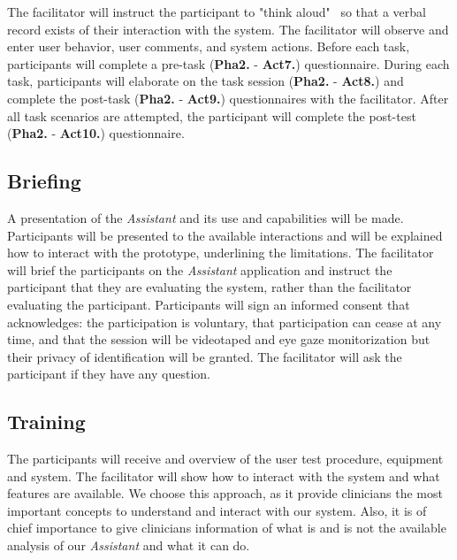 The facilitator will instruct the participant to "think aloud"~\cite{bolle2016authors, kilsdonk2016uncovering} so that a verbal record exists of their interaction with the system. The facilitator will observe and enter user behavior, user comments, and system actions. Before each task, participants will complete a pre-task (\textbf{Pha2.} - \textbf{Act7.}) questionnaire. During each task, participants will elaborate on the task session (\textbf{Pha2.} - \textbf{Act8.}) and complete the post-task (\textbf{Pha2.} - \textbf{Act9.}) questionnaires with the facilitator. After all task scenarios are attempted, the participant will complete the post-test (\textbf{Pha2.} - \textbf{Act10.}) questionnaire.



\subsection{Briefing}

A presentation of the \textit{Assistant} and its use and capabilities will be made. Participants will be presented to the available interactions and will be explained how to interact with the prototype, underlining the limitations. The facilitator will brief the participants on the \textit{Assistant} application and instruct the participant that they are evaluating the system, rather than the facilitator evaluating the participant. Participants will sign an informed consent that acknowledges: the participation is voluntary, that participation can cease at any time, and that the session will be videotaped and eye gaze monitorization but their privacy of identification will be granted. The facilitator will ask the participant if they have any question.



\subsection{Training}

The participants will receive and overview of the user test procedure, equipment and system. The facilitator will show how to interact with the system and what features are available. We choose this approach, as it provide clinicians the most important concepts to understand and interact with our system. Also, it is of chief importance to give clinicians information of what is and is not the available analysis of our \textit{Assistant} and what it can do.


\clearpage